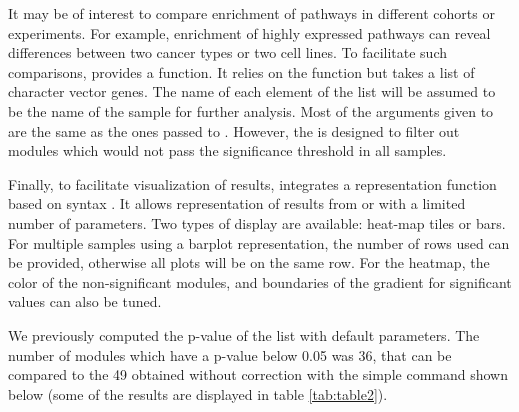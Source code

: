 \documentclass[article]{jss}
\begin{document}


It may be of interest to compare enrichment of pathways in different cohorts or
experiments. For example, enrichment of highly expressed pathways can reveal
differences between two cancer types or two cell lines.  To facilitate such
comparisons,  provides a  function.
It relies on the  function but takes a list of character
vector genes. The name of each element of the list will be assumed to be the
name of the sample for further analysis.  Most of the arguments given to
 are the same as the ones passed to
. However, the  is designed to filter
out modules which would not pass the significance threshold in all samples.   


Finally, to facilitate visualization of results,  integrates a
representation function based on  syntax \citep{ggplot2}. It
allows representation of results from  or
 with a limited number of parameters. Two types of
display are available: heat-map tiles or bars. For multiple samples using a
barplot representation, the number of rows used can be provided, otherwise all
plots will be on the same row. For the heatmap, the color of the
non-significant modules, and boundaries of the gradient for significant values
can also be tuned.

We previously computed the p-value of the  list with default
parameters. The number of modules which have a p-value below 0.05 was 36, that
can be compared to the 49 obtained without correction with the simple command
shown below (some of the results are displayed in table \ref{tab:table2}).
\end{document}
